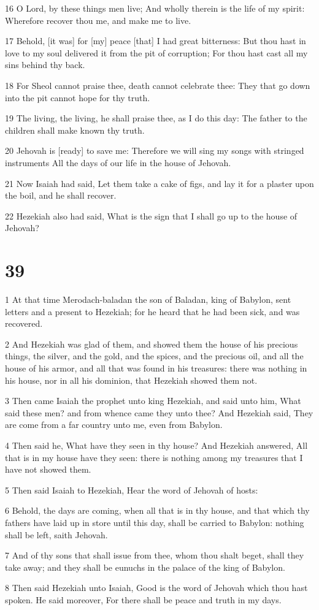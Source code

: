 \par 16 O Lord, by these things men live; And wholly therein is the life of my spirit: Wherefore recover thou me, and make me to live.
\par 17 Behold, [it was] for [my] peace [that] I had great bitterness: But thou hast in love to my soul delivered it from the pit of corruption; For thou hast cast all my sins behind thy back.
\par 18 For Sheol cannot praise thee, death cannot celebrate thee: They that go down into the pit cannot hope for thy truth.
\par 19 The living, the living, he shall praise thee, as I do this day: The father to the children shall make known thy truth.
\par 20 Jehovah is [ready] to save me: Therefore we will sing my songs with stringed instruments All the days of our life in the house of Jehovah.
\par 21 Now Isaiah had said, Let them take a cake of figs, and lay it for a plaster upon the boil, and he shall recover.
\par 22 Hezekiah also had said, What is the sign that I shall go up to the house of Jehovah?

\chapter{39}

\par 1 At that time Merodach-baladan the son of Baladan, king of Babylon, sent letters and a present to Hezekiah; for he heard that he had been sick, and was recovered.
\par 2 And Hezekiah was glad of them, and showed them the house of his precious things, the silver, and the gold, and the spices, and the precious oil, and all the house of his armor, and all that was found in his treasures: there was nothing in his house, nor in all his dominion, that Hezekiah showed them not.
\par 3 Then came Isaiah the prophet unto king Hezekiah, and said unto him, What said these men? and from whence came they unto thee? And Hezekiah said, They are come from a far country unto me, even from Babylon.
\par 4 Then said he, What have they seen in thy house? And Hezekiah answered, All that is in my house have they seen: there is nothing among my treasures that I have not showed them.
\par 5 Then said Isaiah to Hezekiah, Hear the word of Jehovah of hosts:
\par 6 Behold, the days are coming, when all that is in thy house, and that which thy fathers have laid up in store until this day, shall be carried to Babylon: nothing shall be left, saith Jehovah.
\par 7 And of thy sons that shall issue from thee, whom thou shalt beget, shall they take away; and they shall be eunuchs in the palace of the king of Babylon.
\par 8 Then said Hezekiah unto Isaiah, Good is the word of Jehovah which thou hast spoken. He said moreover, For there shall be peace and truth in my days.


